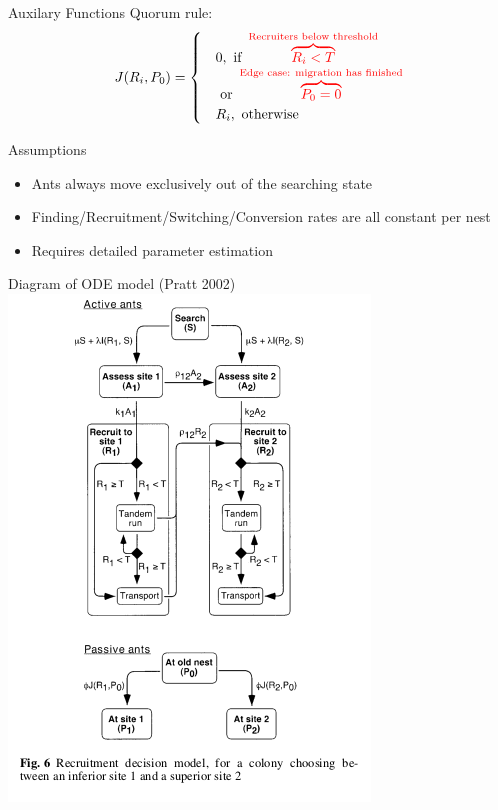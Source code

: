 \documentclass{beamer}
\makeatletter
\def\mcolor#1#{\@mcolor{#1}}
\def\@mcolor#1#2#3{%
  \protect\leavevmode
  \begingroup
    \color#1{#2}#3%
  \endgroup
}
\newcommand{\annotate}[3]{
\mcolor{#1}{\overbrace{#3}^\text{#2}}
}
\makeatother
\begin{document}
  \begin{frame}{Auxilary Functions}
      \Large
      Quorum rule:
      \begin{equation}
          J(R_i, P_0) = 
          \begin{cases}
              & 0,  \text{ if } \annotate{red}{Recruiters below threshold}{R_i < T} \\  
              &     \text{     or } \annotate{red}{Edge case: migration has finished}{P_0 = 0}\\
              & R_i, \text{ otherwise}
          \end{cases}
      \end{equation}
  \end{frame}

  \begin{frame}{Assumptions}
      \begin{itemize}
          \item Ants always move exclusively out of the searching state
          \item Finding/Recruitment/Switching/Conversion rates are all constant per nest
          \item Requires detailed parameter estimation
      \end{itemize}
  \end{frame}

  \begin{frame}{Diagram of ODE model (Pratt 2002)}
       \includegraphics[scale=1.0]{diagram}
  \end{frame}
\end{document}
